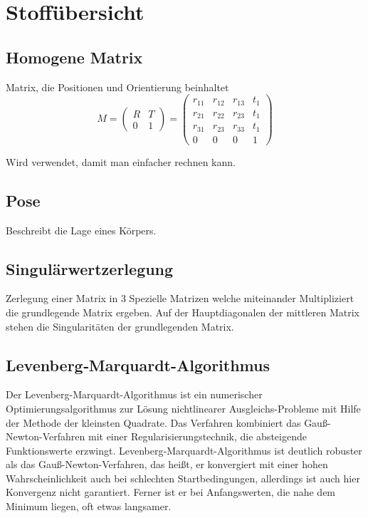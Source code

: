 \chapter{Stoffübersicht}
\label{uebersichtStoffübersicht}

\section{Homogene Matrix}	
\label{uebersicht:sec:homogeneMatrix}
	Matrix, die Positionen und Orientierung beinhaltet 
	\begin{equation}
	M = 
	\left(
	\begin{array}{cc}
	R & T\\
	0 & 1
	\end{array}
	\right)
	=
	\left(
	\begin{array}{cccc}
	r_{11} & r_{12} & r_{13} & t_{1} \\
	r_{21} & r_{22} & r_{23} & t_{1} \\
	r_{31} & r_{23} & r_{33} & t_{1} \\
	0 	   & 0    & 0    & 1  
	\end{array}
	\right)	
	\end{equation}
	
	Wird verwendet, damit man einfacher rechnen kann.

\section{Pose}	
\label{uebersicht:sec:pose}
Beschreibt die Lage eines Körpers.


\section{Singulärwertzerlegung}	
\label{uebersicht:sec:singulärwertzerlegung}
Zerlegung einer Matrix in 3 Spezielle Matrizen welche miteinander Multipliziert die grundlegende Matrix ergeben. Auf der Hauptdiagonalen der mittleren Matrix stehen die Singularitäten der grundlegenden Matrix. 
	
	
\section{Levenberg‐Marquardt-Algorithmus}
\label{uebersicht:sec:Levenberg‐Marquardt}
	Der Levenberg-Marquardt-Algorithmus ist ein numerischer Optimierungsalgorithmus zur Lösung nichtlinearer Ausgleichs-Probleme mit
	Hilfe der Methode der kleinsten Quadrate. Das Verfahren kombiniert das Gauß-Newton-Verfahren mit einer Regularisierungstechnik, die
	absteigende Funktionswerte erzwingt. Levenberg‐Marquardt-Algorithmus ist deutlich robuster als das Gauß-Newton-Verfahren, das heißt, er konvergiert mit einer hohen	Wahrscheinlichkeit auch bei schlechten Startbedingungen, allerdings ist auch hier Konvergenz nicht garantiert. Ferner ist er bei Anfangswerten, die nahe dem Minimum liegen, oft etwas langsamer. 
	
